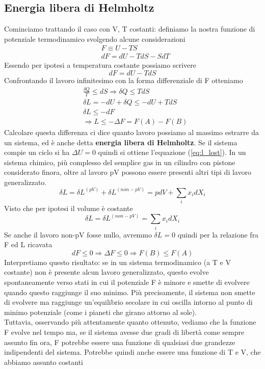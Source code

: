 \documentclass[
10pt, %
a4paper, %
oneside, %
headinclude,footinclude, %
BCOR5mm, %
]{scrartcl}
\begin{document}
\subsection{Energia libera di Helmholtz}
Cominciamo trattando il caso con V, T costanti: definiamo la nostra funzione di potenziale termodinamico svolgendo alcune considerazioni
\begin{align*}
	&F \equiv U - TS\\
	&dF = dU - TdS-SdT
\end{align*}
Essendo per ipotesi a temperatura costante possiamo scrivere
\[dF = dU - TdS\]
Confrontando il lavoro infinitesimo con la forma differenziale di F otteniamo
\begin{align}
	&\frac{\delta Q}{T} \leq dS \Rightarrow \delta Q \leq TdS\nonumber\\
	&\delta L = -dU +\delta Q \leq -dU + TdS\nonumber\\
	&\delta L \leq - dF \label{eq:L_ed_F}\\
	&\Rightarrow L \leq -\Delta F =  F(A) - F(B)\nonumber
\end{align}
Calcolare questa differenza ci dice quanto lavoro possiamo al massimo estrarre da un sistema, ed è anche detta \textbf{energia libera di Helmholtz}. Se il sistema compie un ciclo si ha $\Delta U = 0$ quindi si ottiene l'equazione (\ref{eq:l_lost}).  In un sistema chimico, più complesso del semplice gas in un cilindro con pistone considerato finora, oltre al lavoro pV possono essere presenti altri tipi di lavoro generalizzato. 
\[\delta L = \delta L^{(pV)}+\delta L^{(non-pV)} = pdV + \sum_i x_idX_i\]
Visto che per ipotesi il volume è costante
\[\delta L =\delta L^{(non-pV)} = \sum_i x_idX_i\]
Se anche il lavoro non-pV fosse nullo, avremmo \(\delta L = 0 \) quindi per la relazione fra F ed L ricavata
\[dF \leq 0 \Rightarrow \Delta F \leq 0 \Rightarrow F(B)\leq F(A)\]
Interpretiamo questo risultato: se in un sistema termodinamico (a T e V costante) non è presente alcun lavoro generalizzato, questo evolve spontaneamente verso stati in cui il potenziale F è minore e smette di evolvere quando questo raggiunge il suo minimo. Più precisamente, il sistema non smette di evolvere ma raggiunge un'equilibrio secolare in cui oscilla intorno al punto di minimo potenziale (come i pianeti che girano attorno al sole).\\
Tuttavia, osservando più attentamente quanto ottenuto, vediamo che la funzione F evolve nel tempo ma, se il sistema avesse due gradi di libertà come sempre assunto fin ora, F potrebbe essere una funzione di qualsiasi due grandezze indipendenti del sistema. Potrebbe quindi anche essere una funzione di T e V, che abbiamo assunto costanti
\end{document}

